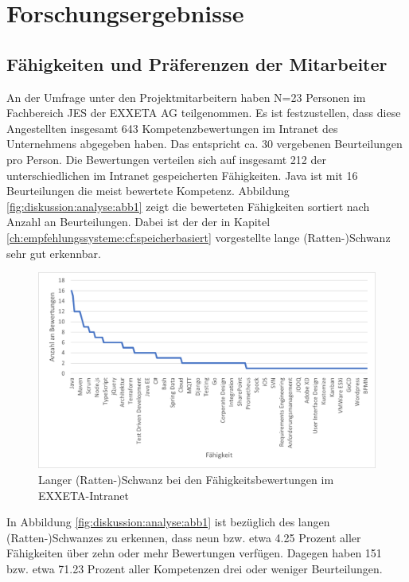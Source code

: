 \chapter{Forschungsergebnisse}
\label{ch:ergebnisse}

\section{Fähigkeiten und Präferenzen der Mitarbeiter}
\label{ch:ergebnisse:analyse}
An der Umfrage unter den Projektmitarbeitern haben N=23 Personen im Fachbereich \acl{JES} der EXXETA AG teilgenommen. Es ist festzustellen, dass diese Angestellten insgesamt 643 Kompetenzbewertungen im Intranet des Unternehmens abgegeben haben. Das entspricht ca. 30 vergebenen Beurteilungen pro Person. Die Bewertungen verteilen sich auf insgesamt 212 der \anzFaehigkeiten unterschiedlichen im Intranet gespeicherten Fähigkeiten. Java ist mit 16 Beurteilungen die meist bewertete Kompetenz. Abbildung \ref{fig:diskussion:analyse:abb1} zeigt die bewerteten Fähigkeiten sortiert nach Anzahl an Beurteilungen. Dabei ist der der in Kapitel \ref{ch:empfehlungssysteme:cf:speicherbasiert} vorgestellte lange (Ratten-)Schwanz sehr gut erkennbar.

\begin{figure}[h]
	\centering
	\includegraphics[width=1\textwidth]{gfx/long-tail-intranet.png}
	\caption{Langer (Ratten-)Schwanz bei den Fähigkeitsbewertungen im EXXETA-Intranet}
	\label{fig:ergebnisse:analyse:abb1}
\end{figure}

In Abbildung \ref{fig:diskussion:analyse:abb1} ist bezüglich des langen (Ratten-)Schwanzes zu erkennen, dass neun bzw. etwa 4.25 Prozent aller Fähigkeiten über zehn oder mehr Bewertungen verfügen. Dagegen haben 151 bzw. etwa 71.23 Prozent aller Kompetenzen drei oder weniger Beurteilungen.

